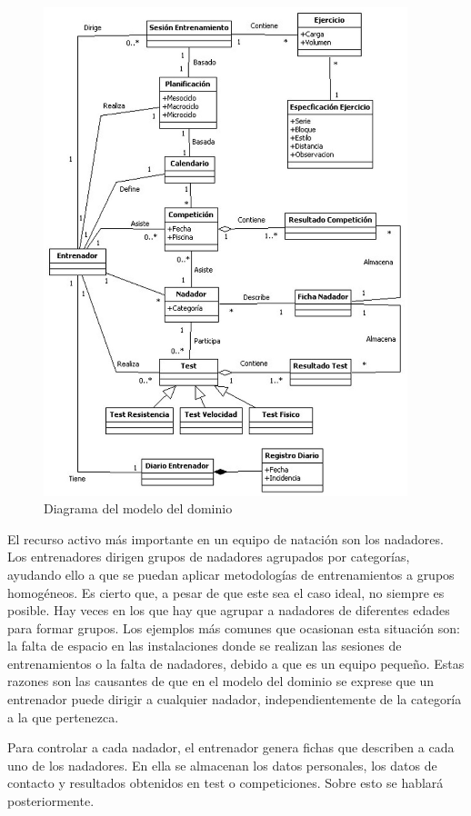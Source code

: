 	\begin{figure}
	  \centering
	    \includegraphics[width=400px]{./eps/captreq_modelo_dominio.eps}
	  \caption{Diagrama del modelo del dominio}
	  \label{fig:modelo_dominio}
	\end{figure}
	
	El recurso activo más importante en un equipo de natación son los nadadores. Los entrenadores dirigen grupos de nadadores agrupados por categorías, ayudando ello a que se puedan aplicar metodologías de entrenamientos a grupos homogéneos. Es cierto que, a pesar de que este sea el caso ideal, no siempre es posible. Hay veces en los que hay que agrupar a nadadores de diferentes edades para formar grupos. Los ejemplos más comunes que ocasionan esta situación son: la falta de espacio en las instalaciones donde se realizan las sesiones de entrenamientos o la falta de nadadores, debido a que es un equipo pequeño. Estas razones son las causantes de que en el modelo del dominio se exprese que un entrenador puede dirigir a cualquier nadador, independientemente de la categoría a la que pertenezca.
	
	Para controlar a cada nadador, el entrenador genera fichas que describen a cada uno de los nadadores. En ella se almacenan los datos personales, los datos de contacto y resultados obtenidos en test o competiciones. Sobre esto se hablará posteriormente.
	
